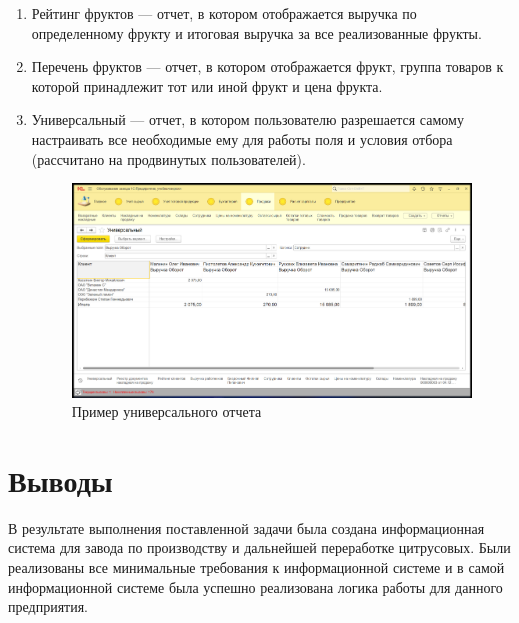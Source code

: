 \documentclass[12pt,a4paper]{article}
\begin{document}
\begin{enumerate}
    \item Рейтинг фруктов --- отчет, в котором отображается выручка по определенному фрукту и итоговая выручка за все реализованные фрукты.
    
    \item Перечень фруктов --- отчет, в котором отображается фрукт, группа товаров к которой принадлежит тот или иной фрукт и цена фрукта.
    
    \item Универсальный --- отчет, в котором пользователю разрешается самому настраивать все необходимые ему для работы поля и условия отбора (рассчитано на продвинутых пользователей).
    
    \begin{figure}[!ht]
        \centering
        \includegraphics[scale=0.4]{Пример универсального отчета.png}
        \caption{Пример универсального отчета}
        \label{fig:universal}
    \end{figure}
\end{enumerate}

\section{Выводы}
В результате выполнения поставленной задачи была создана информационная система для завода по производству и дальнейшей переработке цитрусовых. Были реализованы все минимальные требования к информационной системе и в самой информационной системе была успешно реализована логика работы для данного предприятия.

\newpage

\newcommand{\append}[1]{
    \stepcounter{chapter}https://www.overleaf.com/project/61aeda6bdb40ec593e8d7c4f
    \begin{center}
        \chaptertitlename~\Asbuk{chapter}
    \end{center}
    \begin{center}{#1}\end{center}
    \empline
    \addcontentsline{toc}{chapter}{\Asbuk{chapter}\hspace{0.6em}~#1}}
\end{document}
